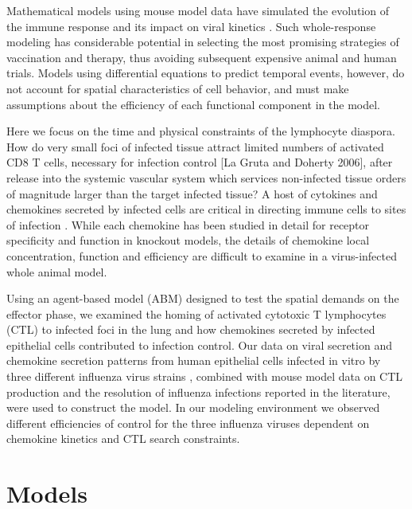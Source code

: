 \documentclass[10pt]{article}
\begin{document}
Mathematical models using mouse model data have simulated the evolution of the immune response and its impact on viral kinetics \cite{Handel2008, Lee2009, Miao2010, Handel2010, Wu2011}.  Such whole-response modeling has considerable potential in selecting the most promising strategies of vaccination and therapy, thus avoiding subsequent expensive animal and human trials.    Models using differential equations to predict temporal events, however, do not account for spatial characteristics of cell behavior, and must make assumptions about the efficiency of each functional component in the model. 

Here we focus on the time and physical constraints of the lymphocyte diaspora.  How do very small foci of infected tissue attract limited numbers of activated CD8 T cells, necessary for infection control \cite{Allan1990} [La Gruta and Doherty 2006], after release into the systemic vascular system which services non-infected tissue orders of magnitude larger than the target infected tissue?  A host of cytokines and chemokines secreted by infected cells are critical in directing immune cells to sites of infection \cite{Kawai1999, Sallusto2000, Zhao2000, Dufour2002, Thelen2008, Sigmundsdottir2008, Sallusto2008, Bromley2008, Kohlmeier2008}.  While each chemokine has been studied in detail for receptor specificity and function in knockout models, the details of chemokine local concentration, function and efficiency are difficult to examine in a virus-infected whole animal model.

Using an agent-based model (ABM) designed to test the spatial demands on the effector phase, we examined the homing of activated cytotoxic T lymphocytes (CTL) to infected foci in the lung and how chemokines secreted by infected epithelial cells contributed to infection control.   Our data on viral secretion and chemokine secretion patterns from human epithelial cells infected in vitro by three different influenza virus strains \cite{Mitchell2011}, combined with mouse model data on CTL production and the resolution of influenza infections reported in the literature, were used to construct the model. In our modeling environment we observed different efficiencies of control for the three influenza viruses dependent on chemokine kinetics and CTL search constraints.



\section*{Models}
\end{document}
